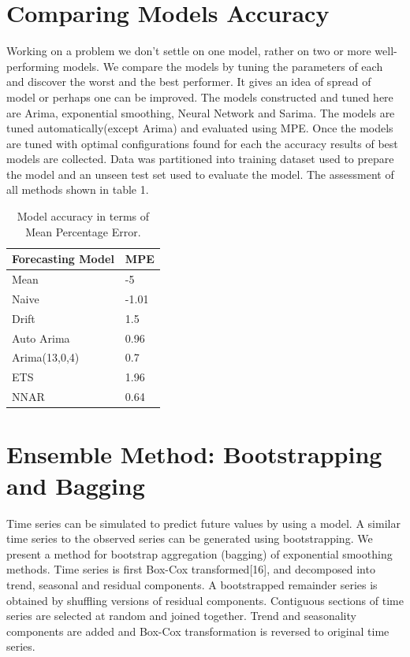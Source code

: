 \documentclass[runningheads]{llncs}
\begin{document}
\section{Comparing Models Accuracy}
Working on a problem we don't settle on one model, rather on two or more well-performing models. We compare the models by tuning the parameters of each and discover the worst and the best performer. It gives an idea of spread of model or perhaps one can be improved.
The models constructed and tuned here are Arima, exponential smoothing, Neural Network and Sarima. The models are tuned automatically(except Arima) and evaluated using MPE. Once the models are tuned with optimal configurations found for each the accuracy results of best models are collected. Data was partitioned into training dataset used to prepare the model and an unseen test set used to evaluate the model.
The assessment of all methods shown in table 1.
\begin{table}
\centering
\caption{Model accuracy in terms of Mean Percentage Error.}\label{tab1}
\begin{tabular}{|l|l|}
\hline
Forecasting Model &  MPE\\
\hline
Mean &  -5\\
Naive &  -1.01\\
Drift & 1.5\\
Auto Arima & 0.96 \\
Arima(13,0,4) & 0.7\\
ETS & 1.96 \\
NNAR & 0.64 \\
\hline
\end{tabular}
\end{table}

\section{Ensemble Method: Bootstrapping and Bagging}
Time series can be simulated to predict future values by using a model. A similar time series to the observed series can be generated using bootstrapping. We present a method for bootstrap aggregation (bagging) of exponential smoothing methods. Time series is first Box-Cox transformed[16], and decomposed into trend, seasonal and residual components. A bootstrapped remainder series is obtained by shuffling versions of residual components. Contiguous sections of time series are selected at random and joined together. Trend and seasonality components are added and Box-Cox transformation is reversed to original time series.
\end{document}
